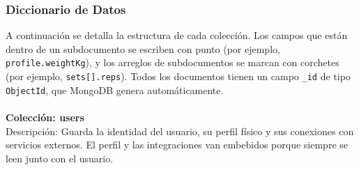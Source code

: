 \subsubsection{Diccionario de Datos}
A continuación se detalla la estructura de cada colección. Los campos que están dentro de un subdocumento se escriben con punto (por ejemplo, \texttt{profile.weightKg}), y los arreglos de subdocumentos se marcan con corchetes (por ejemplo, \texttt{sets[].reps}). Todos los documentos tienen un campo \texttt{\_id} de tipo \texttt{ObjectId}, que MongoDB genera automáticamente.
\\\\
\noindent\textbf{Colección: users} \\
Descripción: Guarda la identidad del usuario, su perfil físico y sus conexiones con servicios externos. El perfil y las integraciones van embebidos porque siempre se leen junto con el usuario.
